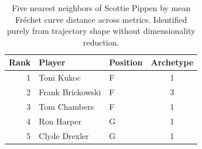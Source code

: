 \begin{table}[htbp]
  \centering\small
  \begin{tabular}{rllc}
    \toprule
    Rank & Player & Position & Archetype \\
    \midrule
    1 & Toni Kukoc & F & 1 \\
    2 & Frank Brickowski & F & 3 \\
    3 & Tom Chambers & F & 1 \\
    4 & Ron Harper & G & 1 \\
    5 & Clyde Drexler & G & 1 \\
    \bottomrule
  \end{tabular}
  \caption{Five nearest neighbors of Scottie Pippen by mean Fr\'{e}chet curve distance across metrics. Identified purely from trajectory shape without dimensionality reduction.}
  \label{tab:Scottie_Pippen_frechet_curve_neighbors}
\end{table}

